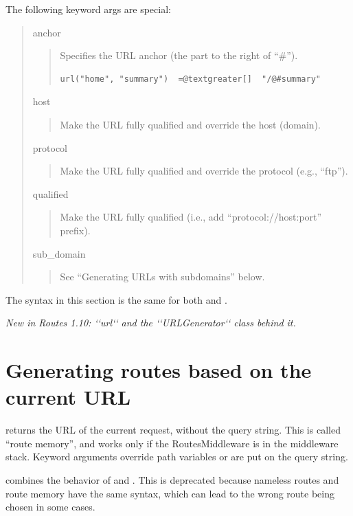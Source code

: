 \documentclass[letterpaper,10pt,english]{manual}
\begin{document}
The following keyword args are special:
\begin{quote}

anchor
\begin{quote}

Specifies the URL anchor (the part to the right of ``\#'').

\begin{Verbatim}[commandchars=@\[\]]
url("home", "summary")  =@textgreater[]  "/@#summary"
\end{Verbatim}
\end{quote}

host
\begin{quote}

Make the URL fully qualified and override the host (domain).
\end{quote}

protocol
\begin{quote}

Make the URL fully qualified and override the protocol (e.g., ``ftp'').
\end{quote}

qualified
\begin{quote}

Make the URL fully qualified (i.e., add ``protocol://host:port'' prefix).
\end{quote}

sub\_domain
\begin{quote}

See ``Generating URLs with subdomains'' below.
\end{quote}
\end{quote}

The syntax in this section is the same for both  and .

\emph{New in Routes 1.10: {}`{}`url{}`{}` and the {}`{}`URLGenerator{}`{}` class behind it.}


\section{Generating routes based on the current URL}

 returns the URL of the current request, without the query
string.  This is called ``route memory'', and works only if the RoutesMiddleware
is in the middleware stack.  Keyword arguments override path variables or are
put on the query string.

 combines the behavior of  and .  This is
deprecated because nameless routes and route memory have the same syntax, which
can lead to the wrong route being chosen in some cases.
\end{document}
